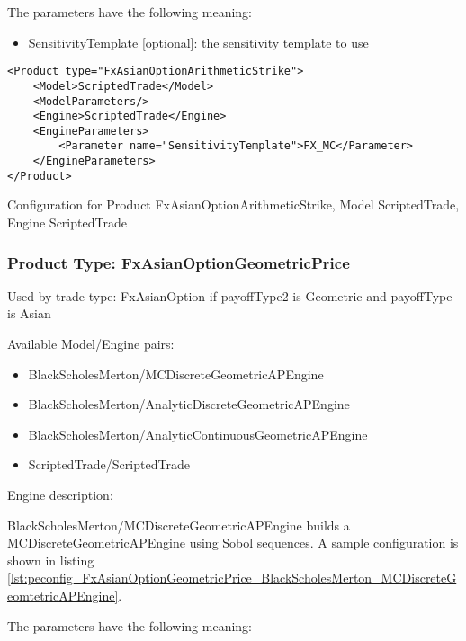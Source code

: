 The parameters have the following meaning:

\begin{itemize}
\item SensitivityTemplate [optional]: the sensitivity template to use 
\end{itemize}

\begin{longlisting}
\begin{verbatim}
<Product type="FxAsianOptionArithmeticStrike">
    <Model>ScriptedTrade</Model>
    <ModelParameters/>
    <Engine>ScriptedTrade</Engine>
    <EngineParameters>
        <Parameter name="SensitivityTemplate">FX_MC</Parameter>
    </EngineParameters>
</Product>
\end{verbatim}
\caption{Configuration for Product FxAsianOptionArithmeticStrike, Model ScriptedTrade, Engine ScriptedTrade}
\label{lst:peconfig_FxAsianOptionArithmeticStrike_ScriptedTrade_ScriptedTrade}
\end{longlisting}

\subsubsection{Product Type: FxAsianOptionGeometricPrice}

Used by trade type: FxAsianOption if payoffType2 is Geometric and payoffType is Asian

Available Model/Engine pairs:

\begin{itemize}
  \item BlackScholesMerton/MCDiscreteGeometricAPEngine
  \item BlackScholesMerton/AnalyticDiscreteGeometricAPEngine
  \item BlackScholesMerton/AnalyticContinuousGeometricAPEngine
  \item ScriptedTrade/ScriptedTrade
\end{itemize}

Engine description:

BlackScholesMerton/MCDiscreteGeometricAPEngine builds a MCDiscreteGeometricAPEngine using Sobol sequences. A sample
configuration is shown in listing
\ref{lst:peconfig_FxAsianOptionGeometricPrice_BlackScholesMerton_MCDiscreteGeomtetricAPEngine}.

The parameters have the following meaning:

